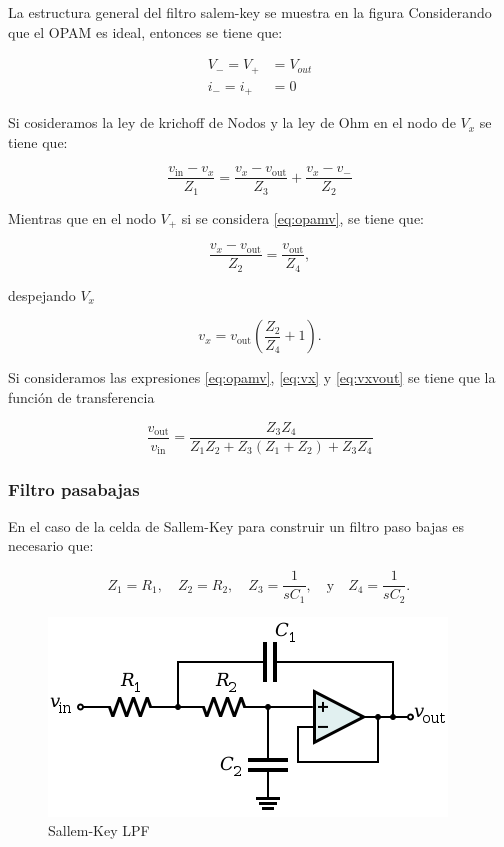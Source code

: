 \documentclass{article}
\begin{document}
    La estructura general del filtro salem-key se muestra en la figura
Considerando que el OPAM es ideal, entonces se tiene que:

\begin{eqnarray}
 V_{-}=V_{+}&=V_{out} \label{eq:opamv} \\
 i_{-}=i_{+}&=0 \label{eq:opami}
 \end{eqnarray}

Si cosideramos la ley de krichoff de Nodos y la ley de Ohm en el nodo de
$V_{x}$ se tiene que:

\begin{equation}\label{eq:vx}
\frac{v_{\text{in}}-v_x}{Z_1}=\frac{v_x-v_{\text{out}}}{Z_3}+\frac{v_x-v_-}{Z_2}
\end{equation}

Mientras que en el nodo $V_{+}$ si se considera \eqref{eq:opamv}, se
tiene que:

\begin{equation}
\frac{v_x-v_{\text{out}}}{Z_2}=\frac{v_{\text{out}}}{Z_4},
\end{equation}

despejando $V_{x}$

\begin{equation}\label{eq:vxvout}
v_x=v_{\text{out}} \left( \frac{Z_2}{Z_4}+1 \right).
\end{equation}

Si consideramos las expresiones \eqref{eq:opamv}, \eqref{eq:vx} y
\eqref{eq:vxvout} se tiene que la función de transferencia

\begin{equation}\label{eq:transsallemkey}
\frac{v_{\text{out}}}{v_{\text{in}}} = \frac{Z_3 Z_4}{Z_1 Z_2 + Z_3(Z_1 + Z_2) + Z_3 Z_4}
\end{equation}

    \subsubsection{Filtro pasabajas}\label{filtro-pasabajas}

En el caso de la celda de Sallem-Key para construir un filtro paso bajas
es necesario que:

\[
Z_1 = R_1, \quad Z_2 = R_2, \quad Z_3 = \frac{1}{s C_1}, \quad \text{y} \quad Z_4 = \frac{1}{s C_2}.\, 
\]

\begin{figure}[htbp]
\centering
\includegraphics{images/sallemkey.png}
\caption{Sallem-Key LPF}
\end{figure}
\end{document}

